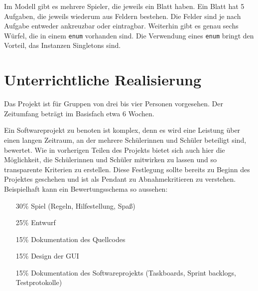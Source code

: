 \documentclass[a4paper,12pt]{article}
\newcommand{\sus}{Schülerinnen und Schüler}
\begin{document}
    Im Modell gibt es mehrere Spieler, die jeweils ein Blatt haben.
    Ein Blatt hat 5 Aufgaben, die jeweils wiederum aus Feldern bestehen.
    Die Felder sind je nach Aufgabe entweder ankreuzbar oder eintragbar.
    Weiterhin gibt es genau sechs Würfel, die in einem \texttt{enum} vorhanden sind.
    Die Verwendung eines \texttt{enum} bringt den Vorteil, das Instanzen Singletons sind.

\section{Unterrichtliche Realisierung}

    Das Projekt ist für Gruppen von drei bis vier Personen vorgesehen.
    Der Zeitumfang beträgt im Basisfach etwa 6 Wochen.

    Ein Softwareprojekt zu benoten ist komplex, denn es wird eine Leistung über
    einen langen Zeitraum, an der mehrere \sus{} beteiligt sind, bewertet.
    Wie in vorherigen Teilen des Projekts bietet sich auch hier die Möglichkeit,
    die \sus{} mitwirken zu lassen und so transparente Kriterien zu erstellen.
    Diese Festlegung sollte bereits zu Beginn des Projektes geschehen und ist 
    als Pendant zu Abnahmekritieren zu verstehen.
    Beispielhaft kann ein Bewertungsschema so aussehen:

    \begin{itemize}
        \item[30\%] Spiel (Regeln, Hilfestellung, Spaß)
        \item[25\%] Entwurf
        \item[15\%] Dokumentation des Quellcodes
        \item[15\%] Design der GUI
        \item[15\%] Dokumentation des Softwareprojekts (Taskboards, Sprint backlogs, Testprotokolle)
    \end{itemize}
\end{document}
